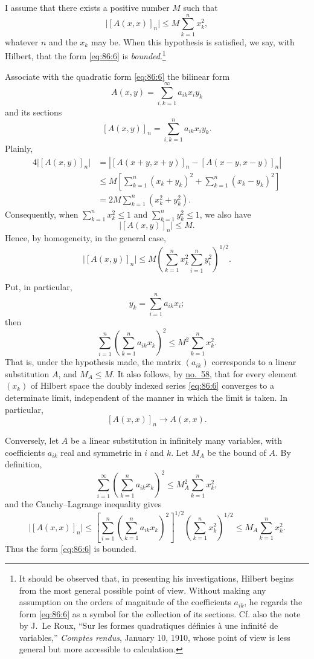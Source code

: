\documentclass[
  paper=b5,
  fontsize=13pt,
  twoside=true,
  open=any,
  bookmarkpackage=false,
  chapterprefix=true,
  headings=normal
]{scrbook}
\theoremstyle{definition}
\begin{document}
I assume that there exists a positive number \(M\) such that
\[
  \lvert[A(x,x)]_n\rvert\le M\sum_{k=1}^{n}x_k^2,
\]
whatever \(n\) and the \(x_k\) may be.  When this hypothesis is satisfied, we
say, with Hilbert, that the form \eqref{eq:86:6} is \emph{bounded}.\footnote{It
should be observed that, in presenting his investigations, Hilbert begins from
the most general possible point of view.  Without making any assumption on the
orders of magnitude of the coefficients \(a_{ik}\), he regards the form
\eqref{eq:86:6} as a symbol for the collection of its sections.  Cf. also the
note by J.~Le Roux, ``Sur les formes quadratiques définies à une infinité de
variables,'' \emph{Comptes rendus}, January 10, 1910, whose point of view is less
general but more accessible to calculation.}

Associate with the quadratic form \eqref{eq:86:6} the bilinear form
\[
  A(x,y)=\sum_{i,k=1}^{\infty}a_{ik}x_iy_k
\]
and its sections
\[
  [A(x,y)]_n=\sum_{i,k=1}^{n}a_{ik}x_iy_k.
\]
Plainly,
\begin{align*}
  4\lvert[A(x,y)]_n\rvert
  &=\left\lvert[A(x+y,x+y)]_n-[A(x-y,x-y)]_n\right\rvert\\
  &\le M\left[\sum_{k=1}^{n}(x_k+y_k)^2+
                    \sum_{k=1}^{n}(x_k-y_k)^2\right]\\
  &=2M\sum_{k=1}^{n}(x_k^2+y_k^2).
\end{align*}
Consequently, when \(\sum_{k=1}^{n}x_k^2\le1\) and
\(\sum_{k=1}^{n}y_k^2\le1\), we also have
\[
  \lvert[A(x,y)]_n\rvert\le M.
\]
Hence, by homogeneity, in the general case,
\[
  \lvert[A(x,y)]_n\rvert\le
  M\left(\sum_{k=1}^{n}x_k^2\sum_{i=1}^{n}y_i^2\right)^{1/2}.
\]

Put, in particular,
\[
  y_k=\sum_{i=1}^{n}a_{ik}x_i;
\]
then
\[
  \sum_{i=1}^{n}\left(\sum_{k=1}^{n}a_{ik}x_k\right)^2
  \le M^2\sum_{k=1}^{n}x_k^2.
\]
That is, under the hypothesis made, the matrix \((a_{ik})\) corresponds to a
linear substitution \(A\), and \(M_A\le M\).  It also follows, by
\hyperref[sec:58]{no.~58}, that for every element \((x_k)\) of Hilbert space the
doubly indexed series \eqref{eq:86:6} converges to a determinate limit,
independent of the manner in which the limit is taken.  In particular,
\[
  [A(x,x)]_n\longrightarrow A(x,x).
\]

Conversely, let \(A\) be a linear substitution in infinitely many variables,
with coefficients \(a_{ik}\) real and symmetric in \(i\) and \(k\).  Let \(M_A\)
be the bound of \(A\).  By definition,
\[
  \sum_{i=1}^{\infty}\left(\sum_{k=1}^{n}a_{ik}x_k\right)^2
  \le M_A^2\sum_{k=1}^{n}x_k^2,
\]
and the Cauchy--Lagrange inequality gives
\[
  \lvert[A(x,x)]_n\rvert
  \le\left[\sum_{i=1}^{n}\left(\sum_{k=1}^{n}a_{ik}x_k\right)^2\right]^{1/2}
      \left(\sum_{k=1}^{n}x_k^2\right)^{1/2}
  \le M_A\sum_{k=1}^{n}x_k^2.
\]
Thus the form \eqref{eq:86:6} is bounded.
\end{document}
